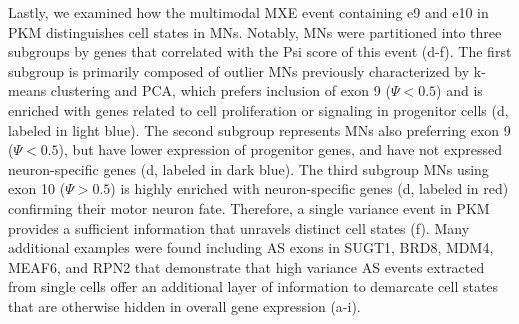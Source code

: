\addtocounter{figure}{1}
\clearpage


Lastly, we examined how the multimodal MXE event containing e9 and e10 in PKM distinguishes cell states in MNs. Notably, MNs were partitioned into three subgroups by genes that correlated with the Psi score of this event (d-f). The first subgroup is primarily composed of outlier MNs previously characterized by k-means clustering and PCA, which prefers inclusion of exon 9 ($\Psi < 0.5$) and is enriched with genes related to cell proliferation or signaling in progenitor cells (d, labeled in light blue). The second subgroup represents MNs also preferring exon 9 ($\Psi < 0.5$), but have lower expression of progenitor genes, and have not expressed neuron-specific genes (d, labeled in dark blue). The third subgroup MNs using exon 10 ($\Psi > 0.5$) is highly enriched with neuron-specific genes (d, labeled in red) confirming their motor neuron fate. Therefore, a single variance event in PKM provides a sufficient information that unravels distinct cell states (f). Many additional examples were found including AS exons in SUGT1, BRD8, MDM4, MEAF6, and RPN2 that demonstrate that high variance AS events extracted from single cells offer an additional layer of information to demarcate cell states that are otherwise hidden in overall gene expression (a-i).


